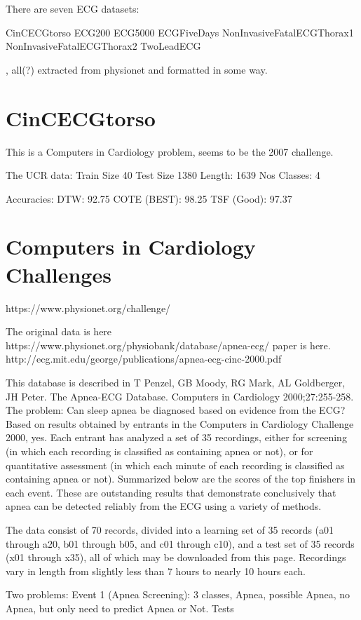 There are seven ECG datasets:

CinCECGtorso
ECG200
ECG5000
ECGFiveDays
NonInvasiveFatalECGThorax1
NonInvasiveFatalECGThorax2
TwoLeadECG

, all(?) extracted from physionet and formatted in some way.

\section{CinCECGtorso}

This is a Computers in Cardiology problem, seems to be the 2007 challenge. 

The UCR data:
Train Size 40
Test Size 1380
Length:	1639	
Nos Classes: 4

Accuracies: 
DTW: 92.75
COTE (BEST): 98.25
TSF (Good): 97.37

\section{Computers in Cardiology Challenges}

https://www.physionet.org/challenge/


The original data is here
https://www.physionet.org/physiobank/database/apnea-ecg/
paper is here.
http://ecg.mit.edu/george/publications/apnea-ecg-cinc-2000.pdf

This database is described in
T Penzel, GB Moody, RG Mark, AL Goldberger, JH Peter.  The Apnea-ECG Database. Computers in Cardiology 2000;27:255-258.
The problem:
Can sleep apnea be diagnosed based on evidence from the ECG? Based on results obtained by entrants in the Computers in Cardiology Challenge 2000, yes. Each entrant has analyzed a set of 35 recordings, either for screening (in which each recording is classified as containing apnea or not), or for quantitative assessment (in which each minute of each recording is classified as containing apnea or not). Summarized below are the scores of the top finishers in each event. These are outstanding results that demonstrate conclusively that apnea can be detected reliably from the ECG using a variety of methods.

The data consist of 70 records, divided into a learning set of 35 records (a01 through a20, b01 through b05, and c01 through c10), and a test set of 35 records (x01 through x35), all of which may be downloaded from this page. Recordings vary in length from slightly less than 7 hours to nearly 10 hours each.

Two problems:
Event 1 (Apnea Screening):
3 classes, Apnea, possible Apnea, no Apnea, but only need to predict Apnea or Not.
Tests

